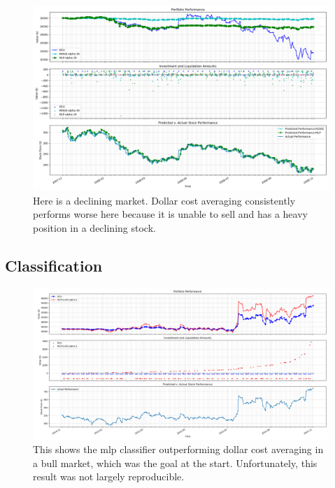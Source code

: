 \documentclass[12pt]{article}
\begin{document}
\begin{figure}
	\centering
	\includegraphics[width=\linewidth]{../Results/GOOG-DCA-RIDGE-MLP-2007-11-01--2008-11-01-alphas--[30]-train_length-500-performanceplot}
	\caption{Here is a declining market. Dollar cost averaging consistently performs worse here because it is unable to sell and has a heavy position in a declining stock.}
	\label{fig:goog-dca-ridge-mlp-2007-11-01--2008-11-01-alphas--30-trainlength-500-performanceplot}
\end{figure}





\subsection{Classification}

\begin{figure}
	\centering
	\includegraphics[width=\linewidth]{../Results/victory}
	\caption{This shows the mlp classifier outperforming dollar cost averaging in a bull market, which was the goal at the start. Unfortunately, this result was not largely reproducible.}
	\label{fig:victory}
\end{figure}
\end{document}
